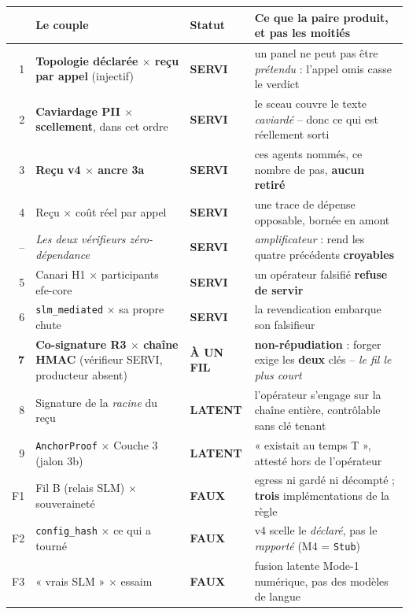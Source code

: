 \documentclass[10pt]{article}
\newcommand{\servi}{{\color{green}\textbf{SERVI}}}
\newcommand{\latent}{{\color{plum}\textbf{LATENT}}}
\newcommand{\unfil}{{\color{amber}\textbf{À UN FIL}}}
\newcommand{\faux}{{\color{red}\textbf{FAUX}}}
\newcommand{\sz}[1]{{\small\color{grey}\textsf{#1}}}
\newcommand{\code}[1]{\texttt{\small #1}}
\newcommand{\x}{$\times$}
\begin{document}
\renewcommand{\arraystretch}{1.16}
\begin{center}\small
\begin{tabular}{@{}r >{\raggedright\arraybackslash}p{5.0cm} l >{\raggedright\arraybackslash}p{7.4cm}@{}}
\toprule
& \textbf{Le couple} & \textbf{Statut} & \textbf{Ce que la paire produit, et pas les moitiés} \\
\midrule
1 & \textbf{Topologie déclarée \x{} reçu par appel} \sz{(injectif)} & \servi &
  un panel ne peut pas être \emph{prétendu} : l'appel omis casse le verdict \\
2 & \textbf{Caviardage PII \x{} scellement}, dans cet ordre & \servi &
  le sceau couvre le texte \emph{caviardé} -- donc ce qui est réellement sorti \\
3 & \textbf{Reçu v4 \x{} ancre 3a} & \servi &
  ces agents nommés, ce nombre de pas, \textbf{aucun retiré} \\
4 & Reçu \x{} coût réel par appel & \servi &
  une trace de dépense opposable, bornée en amont \\
-- & \emph{Les deux vérifieurs zéro-dépendance} & \servi &
  \emph{amplificateur} : rend les quatre précédents \textbf{croyables} \\
5 & Canari H1 \x{} participants efe-core & \servi &
  un opérateur falsifié \textbf{refuse de servir} \\
6 & \code{slm\_mediated} \x{} sa propre chute & \servi &
  la revendication embarque son falsifieur \\
\midrule
\textbf{7} & \textbf{Co-signature R3 \x{} chaîne HMAC} \sz{(vérifieur SERVI, producteur absent)} & \unfil &
  \textbf{non-répudiation} : forger exige les \textbf{deux} clés -- \emph{le fil le plus court} \\
8 & Signature de la \emph{racine} du reçu & \latent &
  l'opérateur s'engage sur la chaîne entière, contrôlable sans clé tenant \\
9 & \code{AnchorProof} \x{} Couche 3 (jalon 3b) & \latent &
  « existait au temps T », attesté hors de l'opérateur \\
\midrule
F1 & Fil B (relais SLM) \x{} souveraineté & \faux &
  egress ni gardé ni décompté ; \textbf{trois} implémentations de la règle \\
F2 & \code{config\_hash} \x{} ce qui a tourné & \faux &
  v4 scelle le \emph{déclaré}, pas le \emph{rapporté} (M4 = \code{Stub}) \\
F3 & « vrais SLM » \x{} essaim & \faux &
  fusion latente Mode-1 numérique, pas des modèles de langue \\
\bottomrule
\end{tabular}
\end{center}
\end{document}
